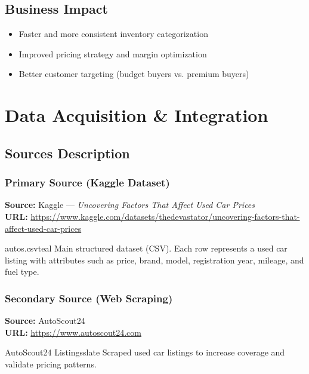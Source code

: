 \documentclass[12pt, a4paper]{article}
\begin{document}
\subsection{Business Impact}

\begin{itemize}
  \item Faster and more consistent inventory categorization
  \item Improved pricing strategy and margin optimization
  \item Better customer targeting (budget buyers vs. premium buyers)
\end{itemize}
\newpage
\section{Data Acquisition \& Integration}

\subsection{Sources Description}
\subsubsection{Primary Source (Kaggle Dataset)}
\textbf{Source:} Kaggle --- \emph{Uncovering Factors That Affect Used Car Prices} \\
\textbf{URL:} \href{uncovering-factors-that-affect-used-car-prices}{https://www.kaggle.com/datasets/thedevastator/uncovering-factors-that-affect-used-car-prices}

\begin{databox}{autos.csv}{teal}
  Main structured dataset (CSV). Each row represents a used car listing with attributes such as price, brand, model, registration year, mileage, and fuel type.
\end{databox}

\subsubsection{Secondary Source (Web Scraping)}
\textbf{Source:} AutoScout24 \\
\textbf{URL:} \url{https://www.autoscout24.com}

\begin{databox}{AutoScout24 Listings}{slate}
  Scraped used car listings to increase coverage and validate pricing patterns.
\end{databox}
\end{document}
